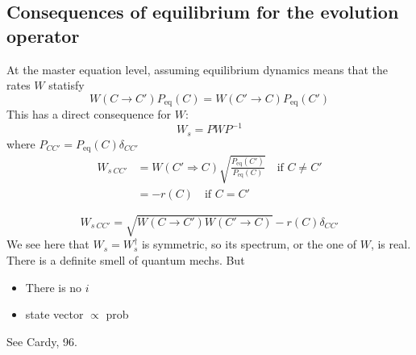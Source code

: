 \documentclass[a4paper]{book}
\theoremstyle{definition}
\theoremstyle{remark}
\begin{document}
\subsection{Consequences of equilibrium for the evolution operator}
At the master equation level, assuming equilibrium dynamics means that the rates $W$ statisfy 
\begin{equation}
    W(C\rightarrow C')P_{\text{eq}}(C) = W(C'\rightarrow C)P_{\text{eq}}(C')
\end{equation}
This has a direct consequence for $W$: 
\begin{equation}
    W_s = PWP^{-1}
\end{equation}
where $P_{CC'} = P_{\text{eq}}(C)\delta_{CC'}$
\begin{equation}
    \begin{aligned}
        W_{s~CC'} &= W(C' \Rightarrow C)\sqrt{\frac{P_{\text{eq}}(C')}{P_{\text{eq}}(C)}} \quad \text{if }C\neq C'\\
        &= -r(C) \quad \text{if }C=C'
    \end{aligned}
\end{equation}

\begin{equation}
    W_{s~CC'} = \sqrt{W(C\rightarrow C')W(C'\rightarrow C)} - r(C)\delta_{CC'}
\end{equation}
We see here that $W_s = W_s^\dagger$ is symmetric, so its spectrum, or the one of $W$, is real. There is a definite smell of quantum mechs. But 
\begin{itemize}
    \item There is no $i$
    \item state vector $\propto$ prob
\end{itemize} 
See Cardy, 96. \par \bigskip 
\end{document}
